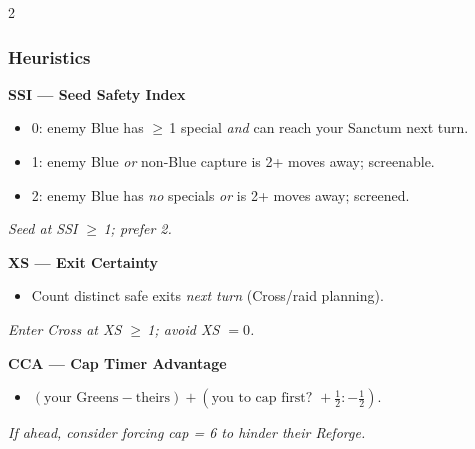 \documentclass[11pt]{article}
\begin{document}
\begin{multicols}{2}
\subsubsection*{Heuristics}
\textbf{SSI --- Seed Safety Index}
\begin{itemize}[leftmargin=1.1em,itemsep=0.15em]
  \item 0: enemy Blue has $\geq$\,1 special \emph{and} can reach your Sanctum next turn.
  \item 1: enemy Blue \emph{or} non-Blue capture is 2+ moves away; screenable.
  \item 2: enemy Blue has \emph{no} specials \emph{or} is 2+ moves away; screened.
\end{itemize}
\emph{Seed at SSI $\geq$\,1; prefer 2.}

\textbf{XS --- Exit Certainty}
\begin{itemize}[leftmargin=1.1em,itemsep=0.15em]
  \item Count distinct safe exits \emph{next turn} (Cross/raid planning).
\end{itemize}
\emph{Enter Cross at XS $\geq$\,1; avoid XS $=0$.}

\textbf{CCA --- Cap Timer  Advantage}
\begin{itemize}[leftmargin=1.1em,itemsep=0.15em]
  \item $(\text{your Greens} - \text{theirs}) + (\text{you to cap first? } +\tfrac12 : -\tfrac12)$.
\end{itemize}
\emph{If ahead, consider forcing cap = 6 to hinder their Reforge.}
\end{multicols}

\newcommand{\slot}{\rule{1.1em}{0.4pt}}
\end{document}
